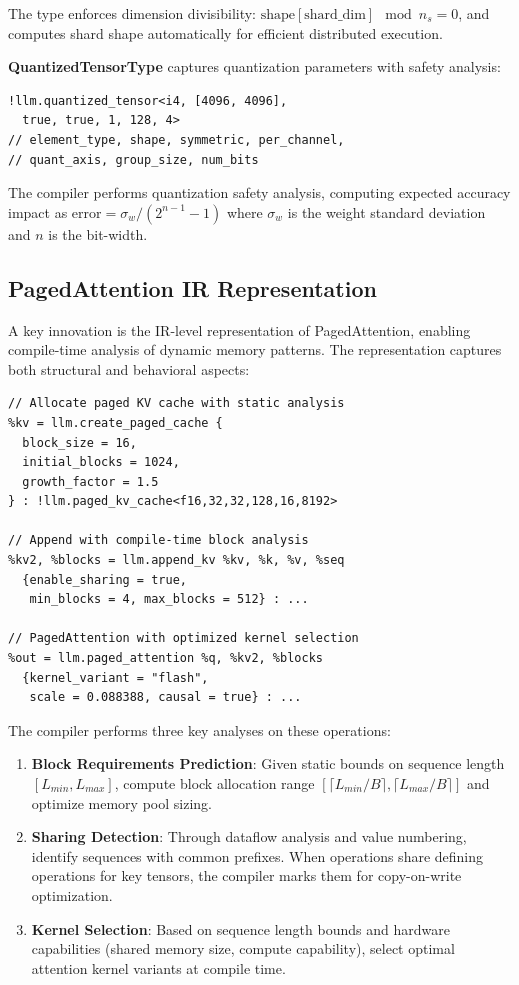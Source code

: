 \documentclass[conference]{IEEEtran}
\begin{document}
The type enforces dimension divisibility: $\text{shape}[\text{shard\_dim}] \mod n_s = 0$, and computes shard shape automatically for efficient distributed execution.

\textbf{QuantizedTensorType} captures quantization parameters with safety analysis:
\begin{mlircode}
\begin{lstlisting}[style=mlir]
!llm.quantized_tensor<i4, [4096, 4096], 
  true, true, 1, 128, 4>
// element_type, shape, symmetric, per_channel,
// quant_axis, group_size, num_bits
\end{lstlisting}
\end{mlircode}

The compiler performs quantization safety analysis, computing expected accuracy impact as $\text{error} = \sigma_w / (2^{n-1} - 1)$ where $\sigma_w$ is the weight standard deviation and $n$ is the bit-width.

\subsection{PagedAttention IR Representation}

A key innovation is the IR-level representation of PagedAttention, enabling compile-time analysis of dynamic memory patterns. The representation captures both structural and behavioral aspects:

\begin{mlircode}
\begin{lstlisting}[style=mlir]
// Allocate paged KV cache with static analysis
%kv = llm.create_paged_cache {
  block_size = 16, 
  initial_blocks = 1024,
  growth_factor = 1.5
} : !llm.paged_kv_cache<f16,32,32,128,16,8192>

// Append with compile-time block analysis
%kv2, %blocks = llm.append_kv %kv, %k, %v, %seq 
  {enable_sharing = true, 
   min_blocks = 4, max_blocks = 512} : ...

// PagedAttention with optimized kernel selection
%out = llm.paged_attention %q, %kv2, %blocks 
  {kernel_variant = "flash",
   scale = 0.088388, causal = true} : ...
\end{lstlisting}
\end{mlircode}

The compiler performs three key analyses on these operations:
\begin{enumerate}
    \item \textbf{Block Requirements Prediction}: Given static bounds on sequence length $[L_{min}, L_{max}]$, compute block allocation range $[\lceil L_{min}/B \rceil, \lceil L_{max}/B \rceil]$ and optimize memory pool sizing.
    \item \textbf{Sharing Detection}: Through dataflow analysis and value numbering, identify sequences with common prefixes. When operations share defining operations for key tensors, the compiler marks them for copy-on-write optimization.
    \item \textbf{Kernel Selection}: Based on sequence length bounds and hardware capabilities (shared memory size, compute capability), select optimal attention kernel variants at compile time.
\end{enumerate}
\end{document}
